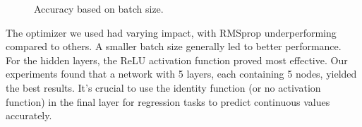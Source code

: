 \documentclass[twoside,11pt]{report}
\begin{document}
\begin{figure}[!ht]
\begin{minipage}[t]{0.5\textwidth - 1mm}
\begin{center}
            \end{center}
            \caption
            {
                Accuracy based on batch size.
            }\label{fig:MSE_batch}
        \end{minipage}
    \end{figure}

    \noindent
    The optimizer we used had varying impact, with RMSprop underperforming compared to others. 
    A smaller batch size generally led to better performance.\\
    
    \noindent
    For the hidden layers, the ReLU activation function proved most effective. Our experiments 
    found that a network with 5 layers, each containing 5 nodes, yielded the best results. It's crucial to 
    use the identity function (or no activation function) in the final layer for regression tasks to predict 
    continuous values accurately.
\end{document}
